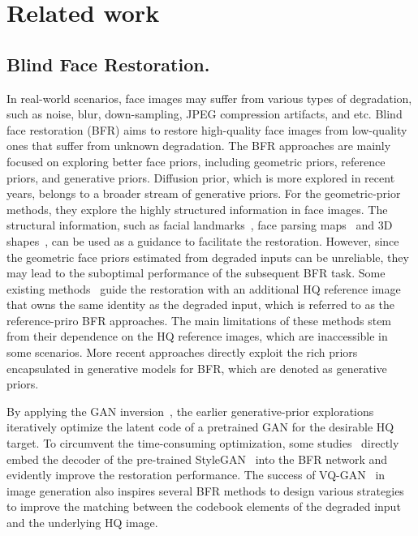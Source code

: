 \section{Related work}
\subsection{Blind Face Restoration.}
In real-world scenarios, face images may suffer from various types of degradation, such as noise, blur, down-sampling, JPEG compression artifacts, and etc. Blind face restoration (BFR) aims to restore high-quality face images from low-quality ones that suffer from unknown degradation. The BFR approaches are mainly focused on exploring better face priors, including geometric priors, reference priors, and generative priors. Diffusion prior, which is more explored in recent years, belongs to a broader stream of generative priors.
For the geometric-prior methods, they explore the highly structured information in face images.
The structural information, such as facial landmarks~\citep{chen2018fsrnet}, face parsing maps~\citep{shen2018deep,chen2021progressive} and 3D shapes~\citep{hu2020face_sr,zhu2022blind_via,lu20243d}, can be used as a guidance to facilitate the restoration.
However, since the geometric face priors estimated from degraded inputs can be unreliable, they may lead to the suboptimal performance of the subsequent BFR task.
Some existing methods~\citep{dogan2019exemplar_guided,Li_2018_bfr_lwg} guide the restoration with an additional HQ reference image that owns the same identity as the degraded input, which is referred to as the reference-priro BFR approaches. 
The main limitations of these methods stem from their dependence on the HQ reference images, which are inaccessible in some scenarios.
More recent approaches directly exploit the rich priors encapsulated in generative models for BFR, which are denoted as generative priors. 

\vspace{-1mm}
By applying the GAN inversion~\citep{xia2022gan_inversion}, the earlier generative-prior explorations~\citep{gu2020image_multi_code_gan,menon2020pulse} iteratively optimize the latent code of a pretrained GAN for the desirable HQ target.
To circumvent the time-consuming optimization, some studies~\citep{yang2021gan,chan2021glean} directly embed the decoder of the pre-trained StyleGAN~\citep{gal2021stylegan} into the BFR network and evidently improve the restoration performance. 
The success of VQ-GAN~\citep{crowson2022vqgan} in image generation also inspires several BFR methods to design various strategies~\citep{wang2022restoreformer,zhou2022codeformer} to improve the matching between the codebook elements of the degraded input and the underlying HQ image.

